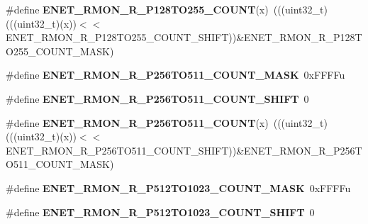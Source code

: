 \begin{DoxyCompactItemize}
\item 
\#define {\bfseries E\+N\+E\+T\+\_\+\+R\+M\+O\+N\+\_\+\+R\+\_\+\+P128\+T\+O255\+\_\+\+C\+O\+U\+NT}(x)~(((uint32\+\_\+t)(((uint32\+\_\+t)(x))$<$$<$E\+N\+E\+T\+\_\+\+R\+M\+O\+N\+\_\+\+R\+\_\+\+P128\+T\+O255\+\_\+\+C\+O\+U\+N\+T\+\_\+\+S\+H\+I\+FT))\&E\+N\+E\+T\+\_\+\+R\+M\+O\+N\+\_\+\+R\+\_\+\+P128\+T\+O255\+\_\+\+C\+O\+U\+N\+T\+\_\+\+M\+A\+SK)\hypertarget{group__ENET__Register__Masks_gab372fe7172a4f45b6c4213ba33fbc596}{}\label{group__ENET__Register__Masks_gab372fe7172a4f45b6c4213ba33fbc596}

\item 
\#define {\bfseries E\+N\+E\+T\+\_\+\+R\+M\+O\+N\+\_\+\+R\+\_\+\+P256\+T\+O511\+\_\+\+C\+O\+U\+N\+T\+\_\+\+M\+A\+SK}~0x\+F\+F\+F\+Fu\hypertarget{group__ENET__Register__Masks_ga0e2ba73bff150ae6ebad2d1b312a6ba2}{}\label{group__ENET__Register__Masks_ga0e2ba73bff150ae6ebad2d1b312a6ba2}

\item 
\#define {\bfseries E\+N\+E\+T\+\_\+\+R\+M\+O\+N\+\_\+\+R\+\_\+\+P256\+T\+O511\+\_\+\+C\+O\+U\+N\+T\+\_\+\+S\+H\+I\+FT}~0\hypertarget{group__ENET__Register__Masks_ga884a28c733b9e8454b467dabce9d1059}{}\label{group__ENET__Register__Masks_ga884a28c733b9e8454b467dabce9d1059}

\item 
\#define {\bfseries E\+N\+E\+T\+\_\+\+R\+M\+O\+N\+\_\+\+R\+\_\+\+P256\+T\+O511\+\_\+\+C\+O\+U\+NT}(x)~(((uint32\+\_\+t)(((uint32\+\_\+t)(x))$<$$<$E\+N\+E\+T\+\_\+\+R\+M\+O\+N\+\_\+\+R\+\_\+\+P256\+T\+O511\+\_\+\+C\+O\+U\+N\+T\+\_\+\+S\+H\+I\+FT))\&E\+N\+E\+T\+\_\+\+R\+M\+O\+N\+\_\+\+R\+\_\+\+P256\+T\+O511\+\_\+\+C\+O\+U\+N\+T\+\_\+\+M\+A\+SK)\hypertarget{group__ENET__Register__Masks_gacf7caa034e550af1f45e8821dcebcb0e}{}\label{group__ENET__Register__Masks_gacf7caa034e550af1f45e8821dcebcb0e}

\item 
\#define {\bfseries E\+N\+E\+T\+\_\+\+R\+M\+O\+N\+\_\+\+R\+\_\+\+P512\+T\+O1023\+\_\+\+C\+O\+U\+N\+T\+\_\+\+M\+A\+SK}~0x\+F\+F\+F\+Fu\hypertarget{group__ENET__Register__Masks_ga0b38c45c87433335a5cc1e65eaca9f67}{}\label{group__ENET__Register__Masks_ga0b38c45c87433335a5cc1e65eaca9f67}

\item 
\#define {\bfseries E\+N\+E\+T\+\_\+\+R\+M\+O\+N\+\_\+\+R\+\_\+\+P512\+T\+O1023\+\_\+\+C\+O\+U\+N\+T\+\_\+\+S\+H\+I\+FT}~0\hypertarget{group__ENET__Register__Masks_ga2cc28edd9bf71e3f65d514fd9e1ba3ba}{}\label{group__ENET__Register__Masks_ga2cc28edd9bf71e3f65d514fd9e1ba3ba}


\end{DoxyCompactItemize}
